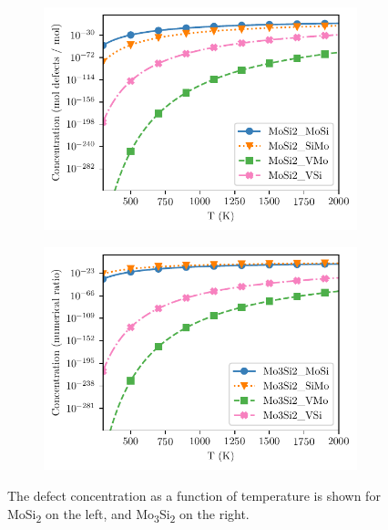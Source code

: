 \documentclass[12pt]{article}
\theoremstyle{plain}
\theoremstyle{definition}
\newcommand{\<}{\langle}
\renewcommand{\>}{\rangle}
\begin{document}
\begin{figure}[b!]
\centering
\begin{subfigure}{.5\textwidth}
  \centering
  \includegraphics[width=\linewidth]{img/mosi2defects.pdf}
  \caption{}
  \label{fig:sub1}
\end{subfigure}%
\begin{subfigure}{.5\textwidth}
  \centering
  \includegraphics[width=\linewidth]{img/mo3si2defects.pdf}
  \caption{}
  \label{fig:sub2}
\end{subfigure}
\caption{The defect concentration as a function of temperature is shown for MoSi\textsubscript{2} on the left, and Mo\textsubscript{3}Si\textsubscript{2} on the right.}
\label{fig:defect-form-temp}
\end{figure}
\end{document}
